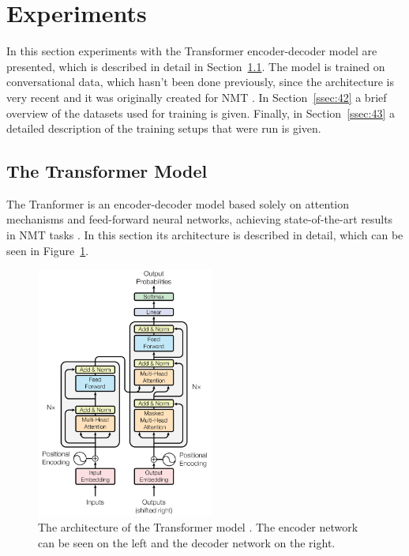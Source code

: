 \documentclass[12pt]{article}
\begin{document}
\newpage\section{Experiments} \label{sec:experiments}
In this section experiments with the Transformer encoder-decoder model are presented, which is described in detail in Section~\ref{ssec:41}. The model is trained on conversational data, which hasn't been done previously, since the architecture is very recent and it was originally created for NMT \cite{Vaswani:2017}. In Section~\ref{ssec:42} a brief overview of the datasets used for training is given. Finally, in Section~\ref{ssec:43} a detailed description of the training setups that were run is given.
\subsection{The Transformer Model} \label{ssec:41}
The Tranformer is an encoder-decoder model based solely on attention mechanisms and feed-forward neural networks, achieving state-of-the-art results in NMT tasks \cite{Vaswani:2017}. In this section its architecture is described in detail, which can be seen in Figure~\ref{fig:transformer}.
\begin{figure}[H] 
	\centering
	\includegraphics[width=0.52\textwidth]{pics/transformer.png}
	\caption{The architecture of the Transformer model \cite{Vaswani:2017}. The encoder network can be seen on the left and the decoder network on the right.}
	\label{fig:transformer}
\end{figure}
\end{document}
